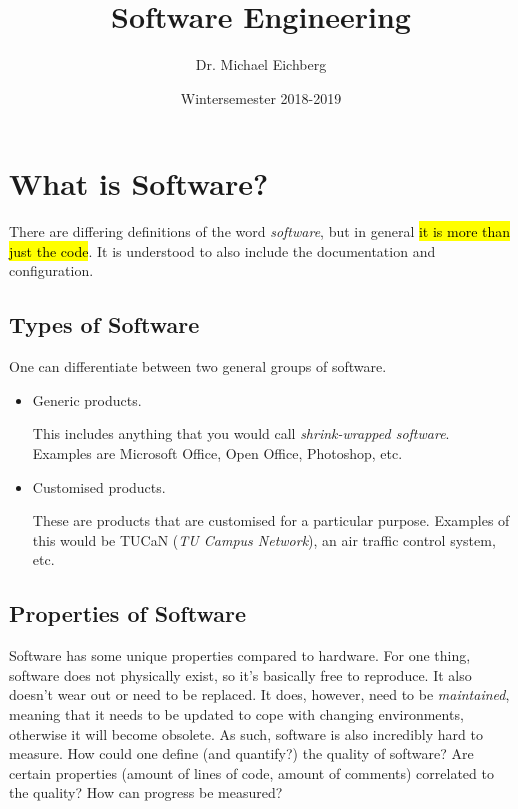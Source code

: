 \documentclass[english]{scrartcl}
\title{Software Engineering}
\date{Wintersemester 2018-2019}
\author{Dr. Michael Eichberg}
\begin{document}
\maketitle
\tableofcontents
\newpage

\section{What is Software?}

There are differing definitions of the word \emph{software}, but in general \hl{it is more than just the code}. It is understood to also include the documentation and configuration. 

\subsection{Types of Software}

One can differentiate between two general groups of software. 
\begin{itemize}
  \item Generic products.
  
  This includes anything that you would call \emph{shrink-wrapped software}. Examples are Microsoft Office, Open Office, Photoshop, etc.
  
  \item Customised products.
  
  These are products that are customised for a particular purpose. Examples of this would be TUCaN (\emph{TU Campus Network}), an air traffic control system, etc.
\end{itemize}

\subsection{Properties of Software}

Software has some unique properties compared to hardware. For one thing, software does not physically exist, so it's basically free to reproduce. It also doesn't wear out or need to be replaced. It does, however, need to be \emph{maintained}, meaning that it needs to be updated to cope with changing environments, otherwise it will become obsolete. As such, software is also incredibly hard to measure. How could one define (and quantify?) the quality of software? Are certain properties (amount of lines of code, amount of comments) correlated to the quality? How can progress be measured?

\end{document}
